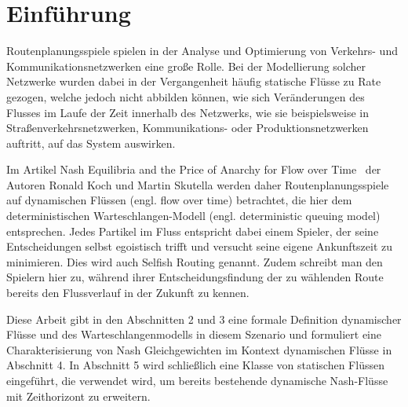 \section{Einführung}\label{introduction}

Routenplanungsspiele spielen in der Analyse und Optimierung von Verkehrs- und Kommunikationsnetzwerken eine große Rolle.
Bei der Modellierung solcher Netzwerke wurden dabei in der Vergangenheit häufig statische Flüsse zu Rate gezogen, welche jedoch nicht abbilden können, wie sich Veränderungen des Flusses im Laufe der Zeit innerhalb des Netzwerks, wie sie beispielsweise in Straßenverkehrsnetzwerken, Kommunikations- oder Produktionsnetzwerken auftritt, auf das System auswirken.

Im Artikel \glqq Nash Equilibria and the Price of Anarchy for Flow over Time\grqq\ \cite{Koch2011} der Autoren Ronald Koch und Martin Skutella werden daher Routenplanungsspiele auf dynamischen Flüssen (engl. flow over time) betrachtet, die hier dem deterministischen Warte\-schlangen-Modell (engl. deterministic queuing model) entsprechen.
Jedes Partikel im Fluss entspricht dabei einem Spieler, der seine Entscheidungen selbst egoistisch trifft und versucht seine eigene Ankunftszeit zu minimieren.
Dies wird auch Selfish Routing genannt.
Zudem schreibt man den Spielern hier zu, während ihrer Entscheidungsfindung der zu wählenden Route bereits den Flussverlauf in der Zukunft zu kennen.

Diese Arbeit gibt in den Abschnitten 2 und 3 eine formale Definition dynamischer Flüsse und des Warteschlangenmodells in diesem Szenario und formuliert eine Charakterisierung von Nash Gleichgewichten im Kontext dynamischen Flüsse in Abschnitt 4.
In Abschnitt 5 wird schließlich eine Klasse von statischen Flüssen eingeführt, die verwendet wird, um bereits bestehende dynamische Nash-Flüsse mit Zeithorizont zu erweitern.